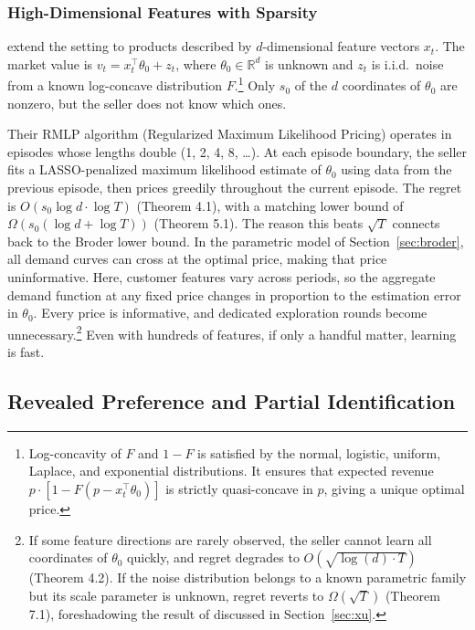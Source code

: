\subsubsection{High-Dimensional Features with Sparsity}
\label{sec:javanmard}

\citet{Javanmard2019} extend the setting to products described by $d$-dimensional feature vectors $x_t$. The market value is $v_t = x_t^\top \theta_0 + z_t$, where $\theta_0 \in \mathbb{R}^d$ is unknown and $z_t$ is i.i.d.\ noise from a known log-concave distribution $F$.\footnote{Log-concavity of $F$ and $1 - F$ is satisfied by the normal, logistic, uniform, Laplace, and exponential distributions. It ensures that expected revenue $p \cdot [1 - F(p - x_t^\top \theta_0)]$ is strictly quasi-concave in $p$, giving a unique optimal price.} Only $s_0$ of the $d$ coordinates of $\theta_0$ are nonzero, but the seller does not know which ones.

Their RMLP algorithm (Regularized Maximum Likelihood Pricing) operates in episodes whose lengths double (1, 2, 4, 8, \ldots). At each episode boundary, the seller fits a LASSO-penalized maximum likelihood estimate of $\theta_0$ using data from the previous episode, then prices greedily throughout the current episode. The regret is $O(s_0 \log d \cdot \log T)$ (Theorem 4.1), with a matching lower bound of $\Omega(s_0 (\log d + \log T))$ (Theorem 5.1). The reason this beats $\sqrt{T}$ connects back to the Broder lower bound. In the parametric model of Section~\ref{sec:broder}, all demand curves can cross at the optimal price, making that price uninformative. Here, customer features vary across periods, so the aggregate demand function at any fixed price changes in proportion to the estimation error in $\theta_0$. Every price is informative, and dedicated exploration rounds become unnecessary.\footnote{If some feature directions are rarely observed, the seller cannot learn all coordinates of $\theta_0$ quickly, and regret degrades to $O(\sqrt{\log(d) \cdot T})$ (Theorem 4.2). If the noise distribution belongs to a known parametric family but its scale parameter is unknown, regret reverts to $\Omega(\sqrt{T})$ (Theorem 7.1), foreshadowing the result of \citet{Xu2021} discussed in Section~\ref{sec:xu}.} Even with hundreds of features, if only a handful matter, learning is fast.

\subsection{Revealed Preference and Partial Identification}
\label{sec:misra}

